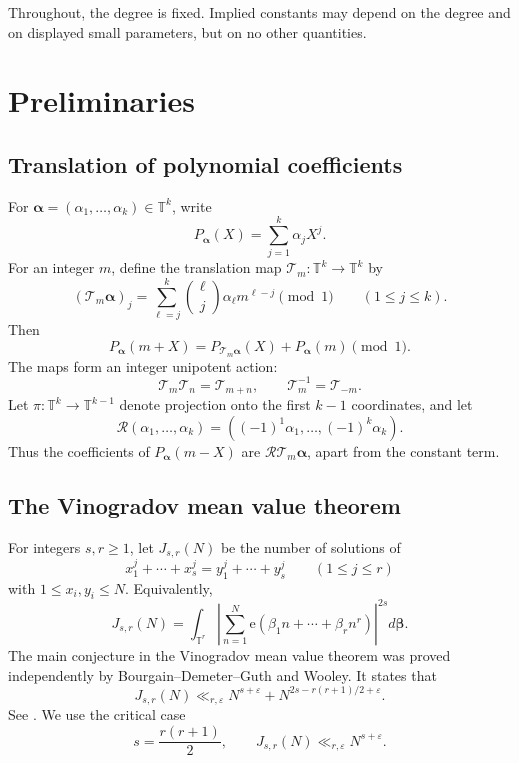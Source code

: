 \documentclass[11pt,reqno]{amsart}
\numberwithin{equation}{section}
\theoremstyle{definition}
\theoremstyle{remark}
\newcommand{\T}{\mathbb T}
\newcommand{\e}{\mathrm e}
\newcommand{\cR}{\mathcal R}
\newcommand{\cT}{\mathcal T}
\begin{document}
Throughout, the degree is fixed.  Implied constants may depend on the degree
and on displayed small parameters, but on no other quantities.

\section{Preliminaries}

\subsection{Translation of polynomial coefficients}

For $\boldsymbol\alpha=(\alpha_1,\ldots,\alpha_k)\in\T^k$, write
\[
  P_{\boldsymbol\alpha}(X)=\sum_{j=1}^{k}\alpha_jX^j.
\]
For an integer $m$, define the translation map $\cT_m:\T^k\to\T^k$ by
\begin{equation}\label{eq:translation-action}
  (\cT_m\boldsymbol\alpha)_j
  =\sum_{\ell=j}^{k}
  \binom{\ell}{j}\alpha_\ell m^{\ell-j}
  \pmod1
  \qquad(1\le j\le k).
\end{equation}
Then
\begin{equation}\label{eq:translated-polynomial}
  P_{\boldsymbol\alpha}(m+X)
  =P_{\cT_m\boldsymbol\alpha}(X)
   +P_{\boldsymbol\alpha}(m)
  \pmod1.
\end{equation}
The maps form an integer unipotent action:
\begin{equation}\label{eq:translation-group-law}
  \cT_m\cT_n=\cT_{m+n},
  \qquad
  \cT_m^{-1}=\cT_{-m}.
\end{equation}
Let $\pi:\T^k\to\T^{k-1}$ denote projection onto the first $k-1$ coordinates, and let
\begin{equation}\label{eq:reflection}
  \cR(\alpha_1,\ldots,\alpha_k)
  =((-1)^1\alpha_1,\ldots,(-1)^k\alpha_k).
\end{equation}
Thus the coefficients of $P_{\boldsymbol\alpha}(m-X)$ are $\cR\cT_m\boldsymbol\alpha$, apart from the constant term.

\subsection{The Vinogradov mean value theorem}

For integers $s,r\ge1$, let $J_{s,r}(N)$ be the number of solutions of
\[
  x_1^j+\cdots+x_s^j
  =y_1^j+\cdots+y_s^j
  \qquad(1\le j\le r)
\]
with $1\le x_i,y_i\le N$.  Equivalently,
\[
  J_{s,r}(N)
  =\int_{\T^r}
  \left|\sum_{n=1}^{N}
  \e(\beta_1n+\cdots+\beta_rn^r)
  \right|^{2s}
  d\boldsymbol\beta.
\]
The main conjecture in the Vinogradov mean value theorem was proved independently by Bourgain--Demeter--Guth and Wooley.  It states that
\begin{equation}\label{eq:vmvt}
  J_{s,r}(N)
  \ll_{r,\varepsilon}
  N^{s+\varepsilon}
  +N^{2s-r(r+1)/2+\varepsilon}.
\end{equation}
See \cite{BourgainDemeterGuth2016,Wooley2019}.  We use the critical case
\begin{equation}\label{eq:critical-vmvt}
  s=\frac{r(r+1)}2,
  \qquad
  J_{s,r}(N)\ll_{r,\varepsilon}N^{s+\varepsilon}.
\end{equation}
\end{document}

